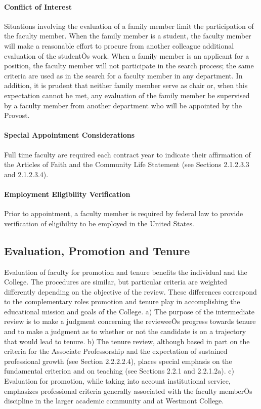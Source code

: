 \documentclass[letterpaper, 11pt]{article}
\begin{document}
			\paragraph{Conflict of Interest}
				Situations involving the evaluation of a family member limit the participation of the faculty member.  When the family member is a student, the faculty member will make a reasonable effort to procure from another colleague additional evaluation of the studentÕs work.  When a family member is an applicant for a position, the faculty member will not participate in the search process; the same criteria are used as in the search for a faculty member in any department.  In addition, it is prudent that neither family member serve as chair or, when this expectation cannot be met, any evaluation of the family member be supervised by a faculty member from another department who will be appointed by the Provost.
			\paragraph{Special Appointment Considerations}
				Full time faculty are required each contract year to indicate their affirmation of the Articles of Faith and the Community Life Statement (see Sections 2.1.2.3.3 and 2.1.2.3.4).
			\paragraph{Employment Eligibility Verification}
				Prior to appointment, a faculty member is required by federal law to provide verification of eligibility to be employed in the United States.
	\subsection{Evaluation, Promotion and Tenure}
		Evaluation of faculty for promotion and tenure benefits the individual and the College. The procedures are similar, but particular criteria are weighted differently depending on the objective of the review.  These differences correspond to the complementary roles promotion and tenure play in accomplishing the educational mission and goals of the College.
		a) The purpose of the intermediate review is to make a judgment concerning the revieweeÕs progress towards tenure and to make a judgment as to whether or not the candidate is on a trajectory that would lead to tenure.
		b) The tenure review, although based in part on the criteria for the Associate Professorship and the expectation of sustained professional growth (see Section 2.2.2.2.4), places special emphasis on the fundamental criterion and on teaching (see Sections 2.2.1 and 2.2.1.2a).
		c) Evaluation for promotion, while taking into account institutional service, emphasizes professional criteria generally associated with the faculty memberÕs discipline in the larger academic community and at Westmont College.
\end{document}
